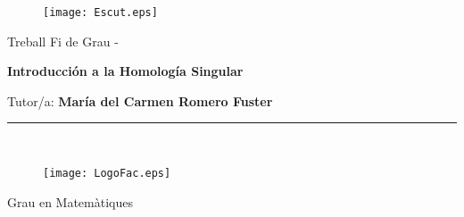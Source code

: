 \begin{titlepage}

\begin{center}
\vspace*{-1in}
\begin{figure}[H]
\begin{center}
\texttt{[image: Escut.eps]}
\end{center}
\end{figure}

\vspace*{0.5in}

\begin{Huge}
Treball Fi de Grau - \@date

\vspace*{0.5in}

\textbf{Introducción a la Homología Singular} \\
\end{Huge}

\vspace*{0.1in}

\begin{huge}


\end{huge}

\vspace*{0.2in}

\vspace*{0.2in}

\begin{Large}
Tutor/a: {\bf \sc
María del Carmen Romero Fuster} \\
\end{Large}

\vspace*{0.5in}

\rule{110mm}{0.1mm}\\


\hspace{-3cm}
\begin{minipage}[t]{.45\textwidth}
\raggedleft
\begin{figure}[H]

\texttt{[image: LogoFac.eps]}
\end{figure}
\end{minipage}
\hfill
\noindent
\begin{minipage}[t]{.45\textwidth}
\raggedleft

\vspace{2cm}
\hspace{-1cm}
\begin{Large}
Grau en Matem\`atiques\\
\end{Large}
\end{minipage}
\end{center}
\end{titlepage}
